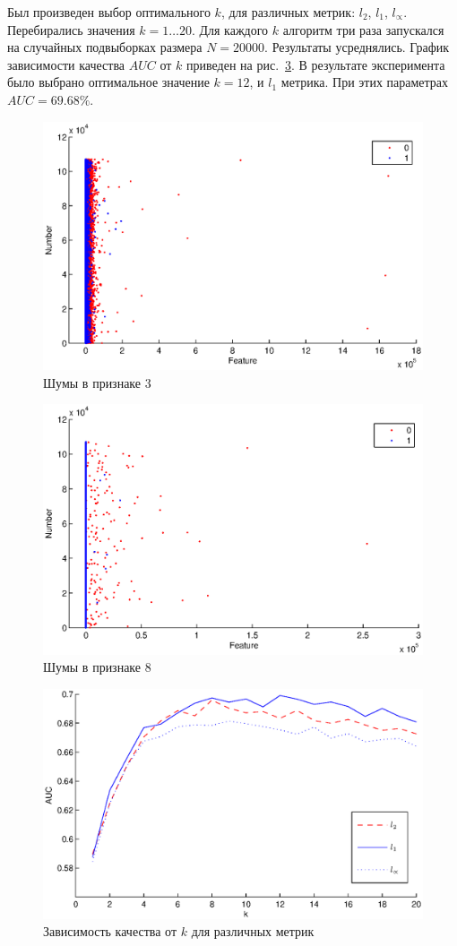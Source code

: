 \documentclass[8pt, a4paper]{article}
\begin{document}
Был произведен выбор оптимального $k$, для различных метрик: $l_2$, $l_1$, $l_{\propto}$.
Перебирались значения $k=1 \hdots 20$. Для каждого $k$ алгоритм три раза запускался на случайных подвыборках
размера $N=20000$. Результаты усреднялись. График зависимости качества $AUC$ от $k$ приведен на
рис.~\ref{metrics}.
В результате эксперимента было выбрано оптимальное значение $k=12$, и $l_1$ метрика.
При этих параметрах $AUC=69.68\%$.
\begin{figure}[h]
    \includegraphics[width=\textwidth]{feat3.eps}
    \caption{Шумы в признаке 3}
    \label{feat3}
\end{figure}
\begin{figure}[h]
    \includegraphics[width=\textwidth]{feat8.eps}
    \caption{Шумы в признаке 8}
    \label{feat8}
\end{figure}
\begin{figure}[h]
    \includegraphics[width=\textwidth]{metrics.eps}
    \caption{Зависимость качества от $k$ для различных метрик}
    \label{metrics}
\end{figure}
\end{document}
